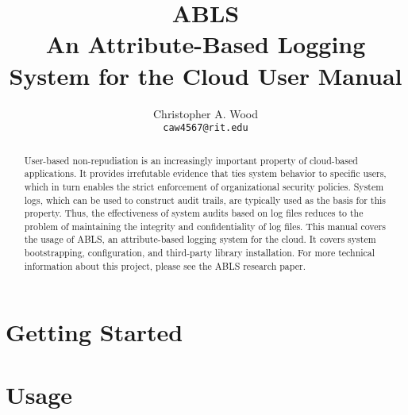 \documentclass[a4paper,11pt]{report}
\begin{document}
\title{\textbf{ABLS} \\ An Attribute-Based Logging System for the Cloud {\small User Manual}}
\author{Christopher A. Wood \\ {\tt caw4567@rit.edu}}
\maketitle
\begin{abstract}\centering
User-based non-repudiation is an increasingly important property of cloud-based applications. It provides irrefutable evidence that ties system behavior to specific users, which in turn enables the strict enforcement of organizational security policies. System logs, which can be used to construct audit trails, are typically used as the basis for this property. Thus, the effectiveness of system audits based on log files reduces to the problem of maintaining the integrity and confidentiality of log files. This manual covers the usage of ABLS, an attribute-based logging system for the cloud. It covers system bootstrapping, configuration, and third-party library installation. For more technical information about this project, please see the ABLS research paper. 
\end{abstract}
\tableofcontents
\chapter{Getting Started}

\chapter{Usage}


{}

\end{document}
